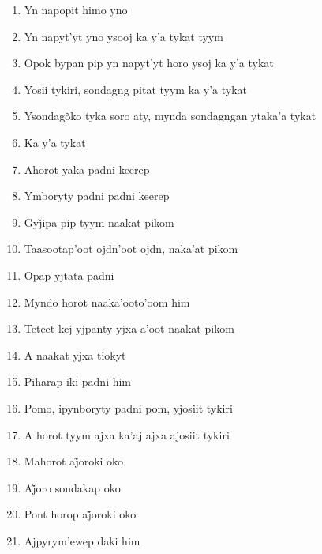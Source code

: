 \begin{enumerate}
 \begin{center}\end{center}
 
 \item Yn napopit himo yno
 \item Yn napyt'yt yno ysooj ka y'a tykat tyym
 \item Opok bypan pip yn napyt'yt horo ysoj ka y'a tykat
 \item Yosii tykiri, sondagng pitat tyym ka y'a tykat
 
 \begin{center}\end{center}
 
 \item Ysondagõko tyka soro aty, mynda sondagngan ytaka'a tykat
 \item Ka y'a tykat
 \item Ahorot yaka padni keerep
 \item Ymboryty padni padni keerep
 
 \begin{center}\end{center}
 
 \item Gyj̃ipa pip tyym naakat pikom
 \item Taasootap'oot ojdn'oot ojdn, naka'at pikom
 \item Opap yjtata padni
 \item Myndo horot naaka'ooto'oom him
 \item Teteet kej yjpanty yjxa a'oot naakat pikom
 \item A naakat yjxa tiokyt
 \item Piharap iki padni him
 \item Pomo, ipynboryty padni pom, yjosiit tykiri
 
 \begin{center}\end{center}
 
 \item A horot tyym ajxa ka'aj ajxa ajosiit tykiri
 \item Mahorot aj̃oroki oko
 \item Aj̃oro sondakap oko
 \item Pont horop aj̃oroki oko
 \item Ajpyrym'ewep daki him
 
 \begin{center}\end{center}
 

\end{enumerate}
